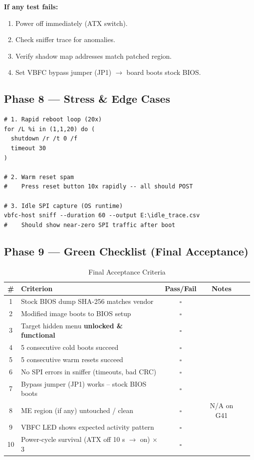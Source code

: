 \textbf{If any test fails:}
\begin{enumerate}
    \item Power off immediately (ATX switch).
    \item Check sniffer trace for anomalies.
    \item Verify shadow map addresses match patched region.
    \item Set VBFC bypass jumper (JP1) $\to$ board boots stock BIOS.
\end{enumerate}

\subsection*{Phase 8 — Stress \& Edge Cases}

\begin{lstlisting}[style=vbfcStyle, caption={Stress Tests}]
# 1. Rapid reboot loop (20x)
for /L %i in (1,1,20) do (
  shutdown /r /t 0 /f
  timeout 30
)

# 2. Warm reset spam
#    Press reset button 10x rapidly -- all should POST

# 3. Idle SPI capture (OS runtime)
vbfc-host sniff --duration 60 --output E:\idle_trace.csv
#    Should show near-zero SPI traffic after boot
\end{lstlisting}

\subsection*{Phase 9 — Green Checklist (Final Acceptance)}

\begin{table}[h]
\centering
\caption{Final Acceptance Criteria}
\label{tab:green_checklist}
\begin{tabular}{@{}clccl@{}}
\toprule
\textbf{\#} & \textbf{Criterion} & \textbf{Pass/Fail} & \textbf{Notes} \\
\midrule
1 & Stock BIOS dump SHA-256 matches vendor & $\square$ & \\
2 & Modified image boots to BIOS setup & $\square$ & \\
3 & Target hidden menu \textbf{unlocked \& functional} & $\square$ & \\
4 & 5 consecutive cold boots succeed & $\square$ & \\
5 & 5 consecutive warm resets succeed & $\square$ & \\
6 & No SPI errors in sniffer (timeouts, bad CRC) & $\square$ & \\
7 & Bypass jumper (JP1) works -- stock BIOS boots & $\square$ & \\
8 & ME region (if any) untouched / clean & $\square$ & N/A on G41 \\
9 & VBFC LED shows expected activity pattern & $\square$ & \\
10 & Power-cycle survival (ATX off 10 s $\to$ on) $\times$ 3 & $\square$ & \\
\bottomrule
\end{tabular}
\end{table}

